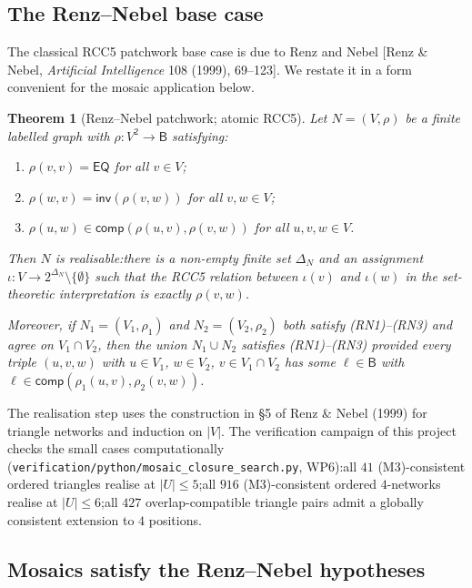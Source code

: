 \documentclass[11pt]{article}
\newtheorem{theorem}{Theorem}[section]
\newcommand{\Base}{\mathsf{B}}
\newcommand{\EQ}{\mathsf{EQ}}
\newcommand{\Inv}{\mathsf{inv}}
\newcommand{\comp}{\mathsf{comp}}
\begin{document}
\subsection{The Renz--Nebel base case}
\label{ssec:renz-nebel}

The classical RCC5 patchwork base case is due to Renz and Nebel [Renz
\& Nebel, \emph{Artificial Intelligence} 108 (1999), 69--123].  We
restate it in a form convenient for the mosaic application below.

\begin{theorem}[Renz--Nebel patchwork; atomic RCC5]\label{thm:RN}
Let $N=(V,\rho)$ be a finite labelled graph with
$\rho:V^2\to\Base$ satisfying:
\begin{enumerate}[label=\textnormal{(RN\arabic*)},leftmargin=3em]
  \item $\rho(v,v)=\EQ$ for all $v\in V$;
  \item $\rho(w,v)=\Inv(\rho(v,w))$ for all $v,w\in V$;
  \item $\rho(u,w)\in\comp(\rho(u,v),\rho(v,w))$ for all $u,v,w\in V$.
\end{enumerate}
Then $N$ is realisable:\@ there is a non-empty finite set $\Delta_N$
and an assignment $\iota:V\to 2^{\Delta_N}\setminus\{\emptyset\}$
such that the RCC5 relation between $\iota(v)$ and $\iota(w)$ in the
set-theoretic interpretation is exactly $\rho(v,w)$.

Moreover, if $N_1=(V_1,\rho_1)$ and $N_2=(V_2,\rho_2)$ both satisfy
\textnormal{(RN1)--(RN3)} and agree on $V_1\cap V_2$, then the union
$N_1\cup N_2$ satisfies \textnormal{(RN1)--(RN3)} provided every
triple $(u,v,w)$ with $u\in V_1$, $w\in V_2$, $v\in V_1\cap V_2$ has
some $\ell\in\Base$ with $\ell\in\comp(\rho_1(u,v),\rho_2(v,w))$.
\end{theorem}

The realisation step uses the construction in \S 5 of Renz \& Nebel
(1999) for triangle networks and induction on $|V|$.  The
verification campaign of this project checks the small cases
computationally (\texttt{verification/python/mosaic\_closure\_search.py},
WP6):\@ all $41$ (M3)-consistent ordered triangles realise at
$|U|\le 5$;\@ all $916$ (M3)-consistent ordered $4$-networks realise
at $|U|\le 6$;\@ all $427$ overlap-compatible triangle pairs admit a
globally consistent extension to $4$ positions.

\subsection{Mosaics satisfy the Renz--Nebel hypotheses}
\label{ssec:mosaic-to-rn}
\end{document}
